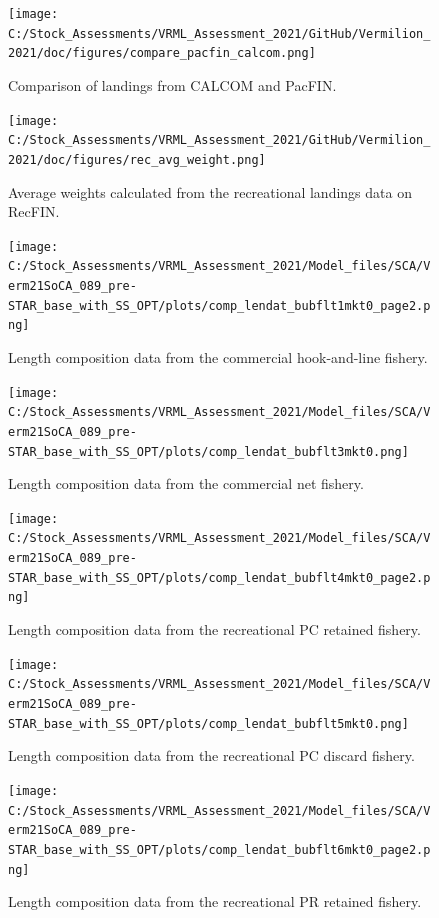 \documentclass[
  english,
  a4paper,
]{article}
\begin{document}
\begin{figure}
\centering
\texttt{[image: C:/Stock\_Assessments/VRML\_Assessment\_2021/GitHub/Vermilion\_2021/doc/figures/compare\_pacfin\_calcom.png]}
\caption{Comparison of landings from CALCOM and PacFIN.\label{fig:calcom-pacfin}}
\end{figure}

\begin{figure}
\centering
\texttt{[image: C:/Stock\_Assessments/VRML\_Assessment\_2021/GitHub/Vermilion\_2021/doc/figures/rec\_avg\_weight.png]}
\caption{Average weights calculated from the recreational landings data on RecFIN.\label{fig:rec-avg-weights}}
\end{figure}

\begin{figure}
\centering
\texttt{[image: C:/Stock\_Assessments/VRML\_Assessment\_2021/Model\_files/SCA/Verm21SoCA\_089\_pre-STAR\_base\_with\_SS\_OPT/plots/comp\_lendat\_bubflt1mkt0\_page2.png]}
\caption{Length composition data from the commercial hook-and-line fishery.\label{fig:len-data-COM-HKL}}
\end{figure}

\begin{figure}
\centering
\texttt{[image: C:/Stock\_Assessments/VRML\_Assessment\_2021/Model\_files/SCA/Verm21SoCA\_089\_pre-STAR\_base\_with\_SS\_OPT/plots/comp\_lendat\_bubflt3mkt0.png]}
\caption{Length composition data from the commercial net fishery.\label{fig:len-data-COM-NET}}
\end{figure}

\begin{figure}
\centering
\texttt{[image: C:/Stock\_Assessments/VRML\_Assessment\_2021/Model\_files/SCA/Verm21SoCA\_089\_pre-STAR\_base\_with\_SS\_OPT/plots/comp\_lendat\_bubflt4mkt0\_page2.png]}
\caption{Length composition data from the recreational PC retained fishery.\label{fig:len-data-REC-PC}}
\end{figure}

\begin{figure}
\centering
\texttt{[image: C:/Stock\_Assessments/VRML\_Assessment\_2021/Model\_files/SCA/Verm21SoCA\_089\_pre-STAR\_base\_with\_SS\_OPT/plots/comp\_lendat\_bubflt5mkt0.png]}
\caption{Length composition data from the recreational PC discard fishery.\label{fig:len-data-REC-PC-DIS}}
\end{figure}

\begin{figure}
\centering
\texttt{[image: C:/Stock\_Assessments/VRML\_Assessment\_2021/Model\_files/SCA/Verm21SoCA\_089\_pre-STAR\_base\_with\_SS\_OPT/plots/comp\_lendat\_bubflt6mkt0\_page2.png]}
\caption{Length composition data from the recreational PR retained fishery.\label{fig:len-data-REC-PR}}
\end{figure}
\end{document}
